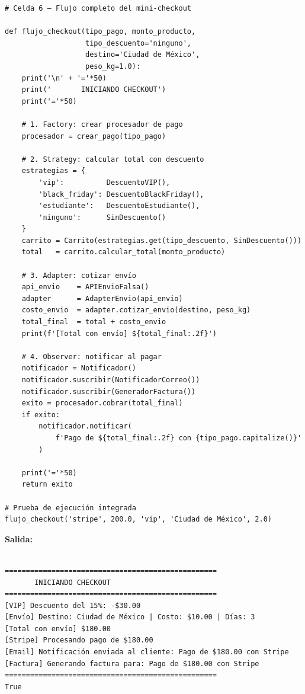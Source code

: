 \documentclass[letterpaper,11pt]{article}
\begin{document}
\begin{lstlisting}[style=pythonreport]
# Celda 6 – Flujo completo del mini-checkout

def flujo_checkout(tipo_pago, monto_producto,
                   tipo_descuento='ninguno',
                   destino='Ciudad de México',
                   peso_kg=1.0):
    print('\n' + '='*50)
    print('       INICIANDO CHECKOUT')
    print('='*50)

    # 1. Factory: crear procesador de pago
    procesador = crear_pago(tipo_pago)

    # 2. Strategy: calcular total con descuento
    estrategias = {
        'vip':          DescuentoVIP(),
        'black_friday': DescuentoBlackFriday(),
        'estudiante':   DescuentoEstudiante(),
        'ninguno':      SinDescuento()
    }
    carrito = Carrito(estrategias.get(tipo_descuento, SinDescuento()))
    total   = carrito.calcular_total(monto_producto)

    # 3. Adapter: cotizar envío
    api_envio    = APIEnvioFalsa()
    adapter      = AdapterEnvio(api_envio)
    costo_envio  = adapter.cotizar_envio(destino, peso_kg)
    total_final  = total + costo_envio
    print(f'[Total con envío] ${total_final:.2f}')

    # 4. Observer: notificar al pagar
    notificador = Notificador()
    notificador.suscribir(NotificadorCorreo())
    notificador.suscribir(GeneradorFactura())
    exito = procesador.cobrar(total_final)
    if exito:
        notificador.notificar(
            f'Pago de ${total_final:.2f} con {tipo_pago.capitalize()}'
        )

    print('='*50)
    return exito

# Prueba de ejecución integrada
flujo_checkout('stripe', 200.0, 'vip', 'Ciudad de México', 2.0)
\end{lstlisting}
\par\noindent\textbf{Salida:}
\begin{lstlisting}[style=reportoutput,language={}]

==================================================
       INICIANDO CHECKOUT
==================================================
[VIP] Descuento del 15%: -$30.00
[Envío] Destino: Ciudad de México | Costo: $10.00 | Días: 3
[Total con envío] $180.00
[Stripe] Procesando pago de $180.00
[Email] Notificación enviada al cliente: Pago de $180.00 con Stripe
[Factura] Generando factura para: Pago de $180.00 con Stripe
==================================================
True
\end{lstlisting}
\end{document}
